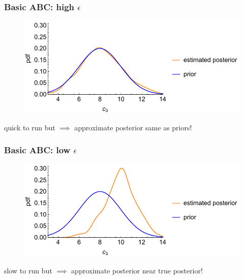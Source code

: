 \documentclass[handout]{beamer}
\begin{document}
\begin{frame}
	\frametitle{Basic ABC: high $\epsilon$}
	
	\begin{figure}[ht]
		\centerline{\includegraphics[width=1\textwidth]{animations_figures/predatorPreyHighEpsilon.pdf}}
	\end{figure}
	
	 quick to run but $\implies$ approximate posterior same as priors!
\end{frame}

\begin{frame}
	\frametitle{Basic ABC: low $\epsilon$}
	
	\begin{figure}[ht]
		\centerline{\includegraphics[width=1\textwidth]{animations_figures/predatorPreyLowEpsilon.pdf}}
	\end{figure}
	
	 slow to run but $\implies$ approximate posterior near true posterior!
\end{frame}
\end{document}
